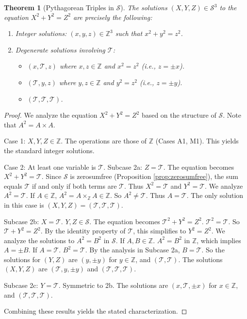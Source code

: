 \documentclass[11pt, a4paper]{article}
\theoremstyle{plain}
\newtheorem{theorem}{Theorem}[section]
\theoremstyle{definition}
\numberwithin{equation}{section}
\newcommand{\Z}{\mathbb{Z}}
\newcommand{\Tobj}{\mathcal{T}} %
\newcommand{\SemiringS}{\mathcal{S}}
\begin{document}
\begin{theorem}[Pythagorean Triples in $\SemiringS$]\label{thm:pythagorean_S}
The solutions $(X, Y, Z) \in \SemiringS^3$ to the equation $X^2+Y^2=Z^2$ are precisely the following:
\begin{enumerate}
    \item Integer solutions: $(x, y, z) \in \Z^3$ such that $x^2+y^2=z^2$.
    \item Degenerate solutions involving $\Tobj$:
    \begin{itemize}
        \item $(x, \Tobj, z)$ where $x, z \in \Z$ and $x^2=z^2$ (i.e., $z=\pm x$).
        \item $(\Tobj, y, z)$ where $y, z \in \Z$ and $y^2=z^2$ (i.e., $z=\pm y$).
        \item $(\Tobj, \Tobj, \Tobj)$.
    \end{itemize}
\end{enumerate}
\end{theorem}
\begin{proof}
We analyze the equation $X^2+Y^2=Z^2$ based on the structure of $\SemiringS$. Note that $A^2=A\times A$.

Case 1: $X, Y, Z \in \Z$. The operations are those of $\Z$ (Cases A1, M1). This yields the standard integer solutions.

Case 2: At least one variable is $\Tobj$.
Subcase 2a: $Z=\Tobj$. The equation becomes $X^2+Y^2=\Tobj$.
Since $\SemiringS$ is zerosumfree (Proposition \ref{prop:zerosumfree}), the sum equals $\Tobj$ if and only if both terms are $\Tobj$. Thus $X^2=\Tobj$ and $Y^2=\Tobj$.
We analyze $A^2=\Tobj$. If $A \in \Z$, $A^2 = A\times_{\Z} A \in \Z$. So $A^2 \neq \Tobj$. Thus $A=\Tobj$.
The only solution in this case is $(X, Y, Z)=(\Tobj, \Tobj, \Tobj)$.

Subcase 2b: $X=\Tobj$. $Y, Z \in \SemiringS$.
The equation becomes $\Tobj^2+Y^2=Z^2$. $\Tobj^2=\Tobj$. So $\Tobj+Y^2=Z^2$.
By the identity property of $\Tobj$, this simplifies to $Y^2=Z^2$.
We analyze the solutions to $A^2=B^2$ in $\SemiringS$.
If $A, B \in \Z$. $A^2=B^2$ in $\Z$, which implies $A=\pm B$.
If $A=\Tobj$. $B^2=\Tobj$. By the analysis in Subcase 2a, $B=\Tobj$.
So the solutions for $(Y, Z)$ are $(y, \pm y)$ for $y\in\Z$, and $(\Tobj, \Tobj)$.
The solutions $(X, Y, Z)$ are $(\Tobj, y, \pm y)$ and $(\Tobj, \Tobj, \Tobj)$.

Subcase 2c: $Y=\Tobj$. Symmetric to 2b. The solutions are $(x, \Tobj, \pm x)$ for $x\in\Z$, and $(\Tobj, \Tobj, \Tobj)$.

Combining these results yields the stated characterization.
\end{proof}
\end{document}

